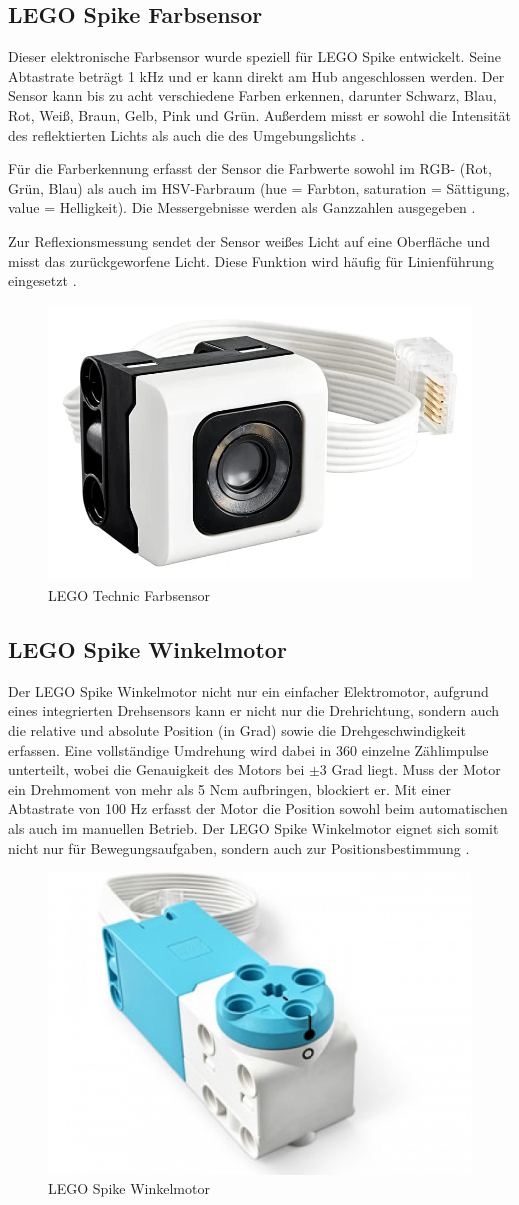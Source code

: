 \subsection{LEGO Spike Farbsensor}
Dieser elektronische Farbsensor wurde speziell für LEGO Spike entwickelt. Seine Abtastrate beträgt 1 kHz und er kann direkt am Hub angeschlossen werden. Der Sensor kann bis zu acht verschiedene Farben erkennen, darunter Schwarz, Blau, Rot, Weiß, Braun, Gelb, Pink und Grün. Außerdem misst er sowohl die Intensität des reflektierten Lichts als auch die des Umgebungslichts \autocite{lego2020colorsensor}\autocite{legoeducation2020spikesensors}.

Für die Farberkennung erfasst der Sensor die Farbwerte sowohl im RGB- (Rot, Grün, Blau) als auch im HSV-Farbraum (hue = Farbton, saturation = Sättigung, value = Helligkeit). Die Messergebnisse werden als Ganzzahlen ausgegeben \autocite{lego2020colorsensor}.

Zur Reflexionsmessung sendet der Sensor weißes Licht auf eine Oberfläche und misst das zurückgeworfene Licht. Diese Funktion wird häufig für Linienführung eingesetzt \autocite{betzold2025colorsensor}\autocite{lego2020colorsensor}.

\begin{figure}[H]
	\centering
	\includegraphics[width=0.4\linewidth]{images/Farbsensor}
	\caption[LEGO Technic Farbsensor Quelle:\autocite{legoeducation2020spikesensors}]{LEGO Technic Farbsensor}
	\label{fig:farbsensor}
\end{figure}

\subsection{LEGO Spike Winkelmotor}
Der LEGO Spike Winkelmotor nicht nur ein einfacher Elektromotor, aufgrund eines integrierten Drehsensors kann er nicht nur die Drehrichtung, sondern auch die relative und absolute Position (in Grad) sowie die Drehgeschwindigkeit erfassen. Eine vollständige Umdrehung wird dabei in 360 einzelne Zählimpulse unterteilt, wobei die Genauigkeit des Motors bei $\pm3$ Grad liegt. Muss der Motor ein Drehmoment von mehr als 5 Ncm aufbringen, blockiert er. Mit einer Abtastrate von 100 Hz erfasst der Motor die Position sowohl beim automatischen als auch im manuellen Betrieb. Der LEGO Spike Winkelmotor eignet sich somit nicht nur für Bewegungsaufgaben, sondern auch zur Positionsbestimmung \autocite{legoeducation2020spikesensors}.

\begin{figure}[H]
	\centering
	\includegraphics[width=0.4\linewidth]{images/Motor}
	\caption[LEGO Spike Winkelmotor Quelle:\autocite{legoeducation2020spikesensors}]{LEGO Spike Winkelmotor}
	\label{fig:motor}
\end{figure}

